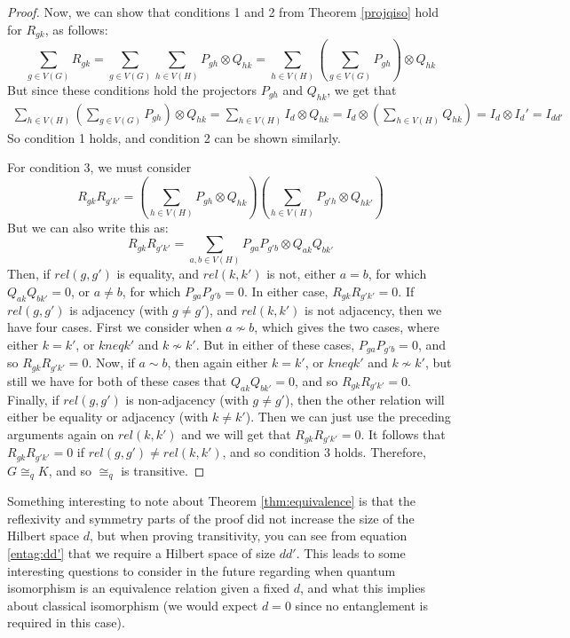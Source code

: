 \documentclass[12pt]{article}
\begin{document}
\begin{proof}
Now,  we can show that conditions 1 and 2 from Theorem \ref{projqiso} hold for $R_{gk}$, as follows: 
\begin{equation}
\sum_{g \in V(G)} R_{gk} = \sum_{g \in V(G)} \sum_{h \in V(H)} P_{gh} \otimes Q_{hk} = \sum_{h \in V(H)} (\sum_{g \in V(G)} P_{gh}) \otimes Q_{hk}
\end{equation} 
But since these conditions hold the projectors $P_{gh}$ and $Q_{hk}$, we get that
\begin{align}
\label{entag:dd'}
\sum_{h \in V(H)} (\sum_{g \in V(G)} P_{gh}) \otimes Q_{hk} = \sum_{h \in V(H)} I_d \otimes Q_{hk} = I_d \otimes (\sum_{h \in V(H)} Q_{hk}) = I_d \otimes I_d' = I_{dd'}
\end{align}
So condition 1 holds, and condition 2 can be shown similarly.

For condition 3, we must consider 
\begin{equation}
R_{gk}R_{g'k'} =(\sum_{h \in V(H)} P_{gh} \otimes Q_{hk})(\sum_{h \in V(H)} P_{g'h} \otimes Q_{hk'})
\end{equation}
But we can also write this as:
\begin{equation}
R_{gk}R_{g'k'} = \sum_{a, b \in V(H)} P_{ga}P_{g'b} \otimes Q_{ak}Q_{bk'}
\end{equation}
Then, if $rel(g, g')$ is equality, and $rel(k, k')$ is not, either $a=b$, for which $Q_{ak}Q_{bk'} = 0$, or $a \neq b$, for which $P_{ga}P_{g'b} = 0$. In either case, $R_{gk}R_{g'k'} = 0$.
If $rel(g, g')$ is adjacency (with $g \neq g'$), and $rel(k, k')$ is not adjacency, then we have four cases. First we consider when $a \nsim b$, which gives the two cases, where either $k = k'$, or $k neq k'$ and $k \nsim k'$. But in either of these cases, $P_{ga}P_{g'b} = 0$, and so $R_{gk}R_{g'k'} = 0$. Now, if $a \sim b$, then again either $k = k'$, or $k neq k'$ and $k \nsim k'$, but still we have for both of these cases that $Q_{ak}Q_{bk'} = 0$, and so $R_{gk}R_{g'k'} = 0$.
Finally, if $rel(g, g')$ is non-adjacency (with $g \neq g'$), then the other relation will either be equality or adjacency (with $k \neq k'$). Then we can just use the preceding arguments again on $rel(k, k')$ and we will get that $R_{gk}R_{g'k'} = 0$. 
It follows that $R_{gk}R_{g'k'} = 0$ if $rel(g, g') \neq rel(k, k')$, and so condition 3 holds.
Therefore, $G \cong_q K$, and so $\cong_q$ is transitive.
\end{proof}

Something interesting to note about Theorem \ref{thm:equivalence} is that the reflexivity and symmetry parts of the proof did not increase the size of the Hilbert space $d$, but when proving transitivity, you can see from equation \ref{entag:dd'} that we require a Hilbert space of size $dd'$. This leads to some interesting questions to consider in the future regarding when quantum isomorphism is an equivalence relation given a fixed $d$, and what this implies about classical isomorphism (we would expect $d=0$ since no entanglement is required in this case).
\end{document}

